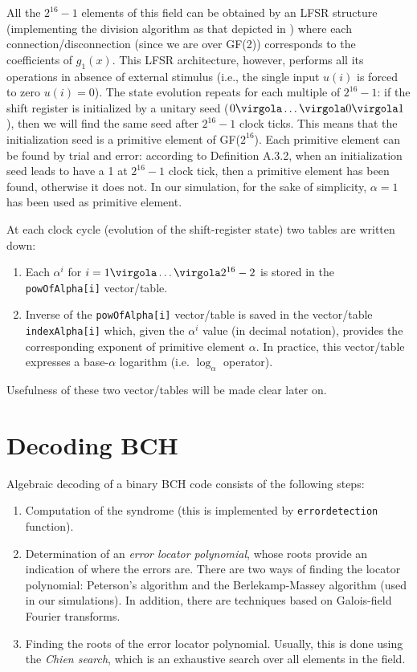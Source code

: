 All the \(2^{16}-1\) elements of this field can be obtained by an LFSR structure (implementing the division algorithm as that depicted in ) where each connection/disconnection (since we are over GF(2)) corresponds to the coefficients of \(g_1(x)\). This LFSR architecture, however, performs all its operations in absence of external stimulus (i.e., the single input \(u(i)\) is forced to zero \(u(i) = 0\)).
The state evolution repeats for each multiple of \(2^{16}-1\): if the shift register is initialized by a unitary seed (\(0\virgola \ldots \virgola 0 \virgola 1 \)), then we will find the same seed after \(2^{16}-1\) clock ticks. This means that the initialization seed is a primitive element of GF(\(2^{16}\)).
Each primitive element can be found by trial and error: according to Definition A.3.2, when an initialization seed leads to have a 1 at \(2^{16}-1\) clock tick, then a primitive element has been found, otherwise it does not. In our simulation, for the sake of simplicity, \(\alpha = 1\) has been used as primitive element.



At each clock cycle (evolution of the shift-register state) two tables are written down: \begin{enumerate}
\item Each \(\alpha^i\) for \(i = 1\virgola \ldots \virgola 2^{16}-2\) is stored in the \texttt{powOfAlpha[i]} vector/table.
\item Inverse of the \texttt{powOfAlpha[i]} vector/table is saved in the vector/table
\texttt{index\-Al\-pha[i]} which, given the \(\alpha^i\) value (in decimal notation), provides the corresponding exponent of primitive element \(\alpha\). In practice, this vector/table expresses a base-\(\alpha\) logarithm (i.e. \(\log_{\alpha}\) operator).
\end{enumerate}
Usefulness of these two vector/tables will be made clear later on.

\section{Decoding BCH}

Algebraic decoding of a binary BCH code consists of the following steps:
\begin{enumerate}
\item Computation of the syndrome (this is implemented by \texttt{errordetection} function).
\item Determination of an \emph{error locator polynomial}, whose roots provide an indication of where the errors are. There are two ways of finding the locator polynomial: Peterson's algorithm and the Berlekamp-Massey algorithm (used in our simulations). In addition, there are techniques based on Galois-field Fourier transforms.
\item Finding the roots of the error locator polynomial. Usually, this is done using the \emph{Chien search}, which is an exhaustive search over all elements in the field.
\end{enumerate}

